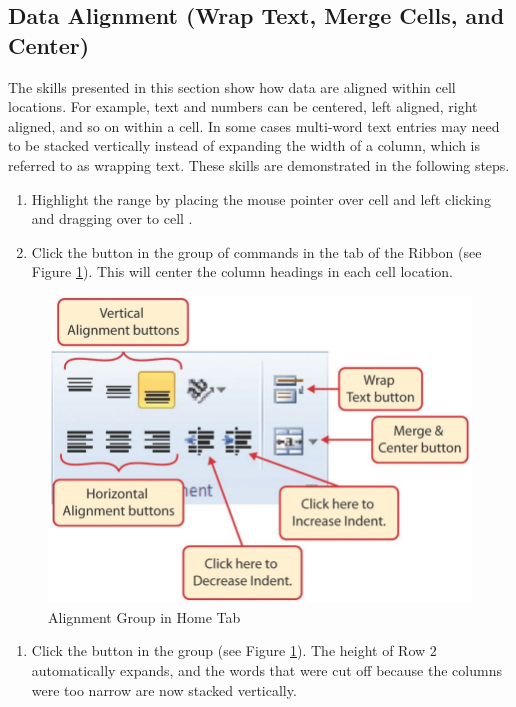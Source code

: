 \subsection{Data Alignment (Wrap Text, Merge Cells, and Center)}

The skills presented in this section show how data are aligned within cell locations. For example, text and numbers can be centered, left aligned, right aligned, and so on within a cell. In some cases multi-word text entries may need to be stacked vertically instead of expanding the width of a column, which is referred to as wrapping text. These skills are demonstrated in the following steps.

\begin{enumerate}
	\item Highlight the range  by placing the mouse pointer over cell  and left clicking and dragging over to cell .
	\item Click the  button in the  group of commands in the  tab of the Ribbon (see Figure \ref{01:fig38}). This will center the column headings in each cell location.
\end{enumerate}

\begin{figure}[H]
	\centering
	\includegraphics[width=\maxwidth{.95\linewidth}]{gfx/ch01_fig38}
	\caption{Alignment Group in Home Tab}
	\label{01:fig38}
\end{figure}

\begin{enumerate}[resume]
	\item Click the  button in the  group (see Figure \ref{01:fig38}). The height of Row $ 2 $ automatically expands, and the words that were cut off because the columns were too narrow are now stacked vertically.
\end{enumerate}

